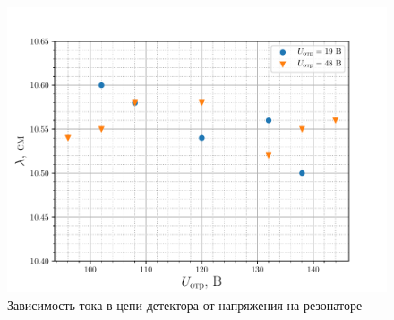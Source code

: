 \begin{figure}[h!]
		\centering
		\includegraphics[width=\linewidth]{fig/task4b}
		\caption{Зависимость тока в цепи детектора от напряжения на резонаторе}
		\label{fig:task4b}
\end{figure}




